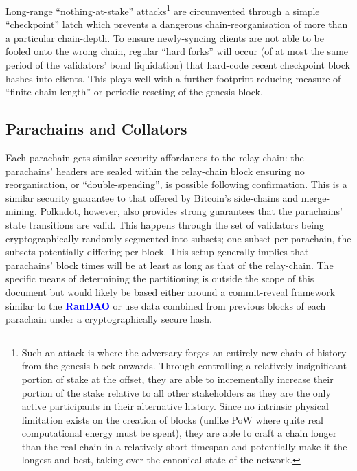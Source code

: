\documentclass[t,usepdftitle=false]{beamer}
\renewcommand{\textit}[1]{\textcolor{blue}{\textbf{#1}}}
\begin{document}
\begin{frame}
Long-range ``nothing-at-stake'' attacks\footnote{Such an attack is where the adversary forges an entirely new chain of history from the genesis block onwards. Through controlling a relatively insignificant portion of stake at the offset, they are able to incrementally increase their portion of the stake relative to all other stakeholders as they are the only active participants in their alternative history. Since no intrinsic physical limitation exists on the creation of blocks (unlike PoW where quite real computational energy must be spent), they are able to craft a chain longer than the real chain in a relatively short timespan and potentially make it the longest and best, taking over the canonical state of the network.} are circumvented through a simple ``checkpoint'' latch which prevents a dangerous chain-reorganisation of more than a particular chain-depth. To ensure newly-syncing clients are not able to be fooled onto the wrong chain, regular ``hard forks'' will occur (of at most the same period of the validators' bond liquidation) that hard-code recent checkpoint block hashes into clients. This plays well with a further footprint-reducing measure of ``finite chain length'' or periodic reseting of the genesis-block.

\subsection{Parachains and Collators}\label{parachains-and-collators}

 Each parachain gets similar security affordances to the relay-chain: the parachains' headers are sealed within the relay-chain block ensuring no reorganisation, or ``double-spending'', is possible following confirmation. This is a similar security guarantee to that offered by Bitcoin's side-chains and merge-mining. Polkadot, however, also provides strong guarantees that the parachains' state transitions are valid. This happens through the set of validators being cryptographically randomly segmented into subsets; one subset per parachain, the subsets potentially differing per block. This setup generally implies that parachains' block times will be at least as long as that of the relay-chain. The specific means of determining the partitioning is outside the scope of this document but would likely be based either around a commit-reveal framework similar to the \textit{RanDAO}\cite{randao} or use data combined from previous blocks of each parachain under a cryptographically secure hash.


\end{frame}
\end{document}
